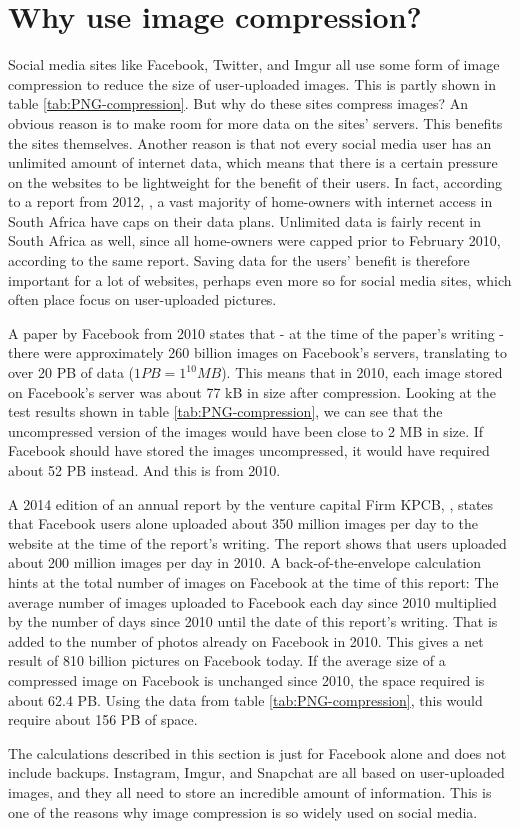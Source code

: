 \section{Why use image compression?}
Social media sites like Facebook, Twitter, and Imgur all use some form of image compression to reduce the size of user-uploaded images.
This is partly shown in table \ref{tab:PNG-compression}.
But why do these sites compress images?
An obvious reason is to make room for more data on the sites' servers.
This benefits the sites themselves.
Another reason is that not every social media user has an unlimited amount of internet data, which means that there is a certain pressure on the websites to be lightweight for the benefit of their users.
In fact, according to a report from 2012, \citep{chetty_2012}, a vast majority of home-owners with internet access in South Africa have caps on their data plans.
Unlimited data is fairly recent in South Africa as well, since all home-owners were capped prior to February 2010, according to the same report.
Saving data for the users' benefit is therefore important for a lot of websites, perhaps even more so for social media sites, which often place focus on user-uploaded pictures.

A paper by Facebook from 2010 \citep{beaver2010} states that - at the time of the paper's writing - there were approximately 260 billion images on Facebook's servers, translating to over 20 PB of data ($1 PB = 1^{10} MB$).
This means that in 2010, each image stored on Facebook's server was about 77 kB in size after compression.
Looking at the test results shown in table \ref{tab:PNG-compression}, we can see that the uncompressed version of the images would have been close to 2 MB in size.
If Facebook should have stored the images uncompressed, it would have required about 52 PB instead.
And this is from 2010.

A 2014 edition of an annual report by the venture capital Firm KPCB, \citep{meeker2014internet}, states that Facebook users alone uploaded about
350 million images per day to the website at the time of the report's writing.
The report shows that users uploaded about 200 million images per day in 2010.
A back-of-the-envelope calculation hints at the total number of images on Facebook at the time of this report:
The average number of images uploaded to Facebook each day since 2010 multiplied by the number of days since 2010 until the date of this report's writing.
That is added to the number of photos already on Facebook in 2010.
This gives a net result of 810 billion pictures on Facebook today.
If the average size of a compressed image on Facebook is unchanged since 2010, the space required is about 62.4 PB.
Using the data from table \ref{tab:PNG-compression}, this would require about 156 PB of space.

The calculations described in this section is just for Facebook alone and does not include backups. Instagram, Imgur, 
and Snapchat are all based on user-uploaded images, and they all need to store an incredible amount of information.
This is one of the reasons why image compression is so widely used on social media.

